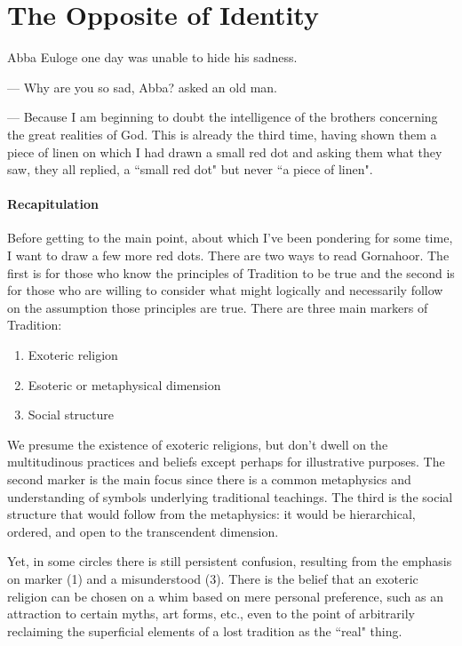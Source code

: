 \section{The Opposite of Identity}

\begin{quotex}
Abba Euloge one day was unable to hide his sadness.

— Why are you so sad, Abba? asked an old man.

— Because I am beginning to doubt the intelligence of the brothers concerning the great realities
of God. This is already the third time, having shown them a piece of linen on which I had drawn a small red dot and
asking them what they saw, they all replied, a ``small red dot" but never ``a piece of linen". 

\end{quotex}
\paragraph{Recapitulation}
Before getting to the main point, about which I've been pondering for some time, I want to draw a
few more red dots. There are two ways to read Gornahoor. The first is for those who know the principles of Tradition to
be true and the second is for those who are willing to consider what might logically and necessarily follow on the
assumption those principles are true. There are three main markers of Tradition:

\begin{enumerate}
\item Exoteric religion 
\item Esoteric or metaphysical dimension 
\item Social structure 
\end{enumerate}
We presume the existence of exoteric religions, but don't dwell on the multitudinous practices and
beliefs except perhaps for illustrative purposes. The second marker is the main focus since there is a common
metaphysics and understanding of symbols underlying traditional teachings. The third is the social structure that would
follow from the metaphysics: it would be hierarchical, ordered, and open to the transcendent dimension.

Yet, in some circles there is still persistent confusion, resulting from the emphasis on marker (1) and a misunderstood
(3). There is the belief that an exoteric religion can be chosen on a whim based on mere personal preference, such as
an attraction to certain myths, art forms, etc., even to the point of arbitrarily reclaiming the superficial elements
of a lost tradition as the ``real" thing.

